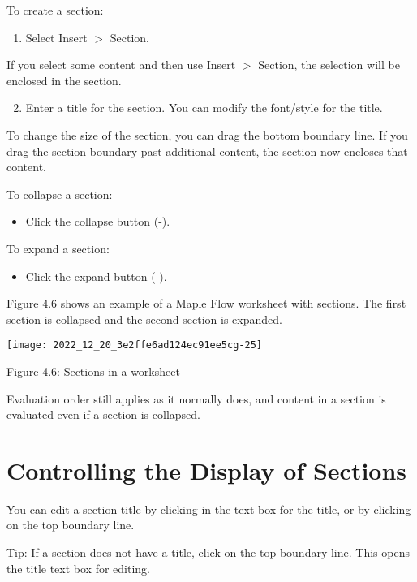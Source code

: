 To create a section:

\begin{enumerate}
  \item Select Insert $>$ Section.
\end{enumerate}

If you select some content and then use Insert $>$ Section, the selection will be enclosed in the section.

\begin{enumerate}
  \setcounter{enumi}{1}
  \item Enter a title for the section. You can modify the font/style for the title.
\end{enumerate}

To change the size of the section, you can drag the bottom boundary line. If you drag the section boundary past additional content, the section now encloses that content.

To collapse a section:

\begin{itemize}
  \item Click the collapse button (-).
\end{itemize}

To expand a section:

\begin{itemize}
  \item Click the expand button ( $)$.
\end{itemize}

Figure 4.6 shows an example of a Maple Flow worksheet with sections. The first section is collapsed and the second section is expanded.

\begin{center}
\texttt{[image: 2022\_12\_20\_3e2ffe6ad124ec91ee5cg-25]}
\end{center}

Figure 4.6: Sections in a worksheet

Evaluation order still applies as it normally does, and content in a section is evaluated even if a section is collapsed.

\section{Controlling the Display of Sections}
You can edit a section title by clicking in the text box for the title, or by clicking on the top boundary line.

Tip: If a section does not have a title, click on the top boundary line. This opens the title text box for editing.


